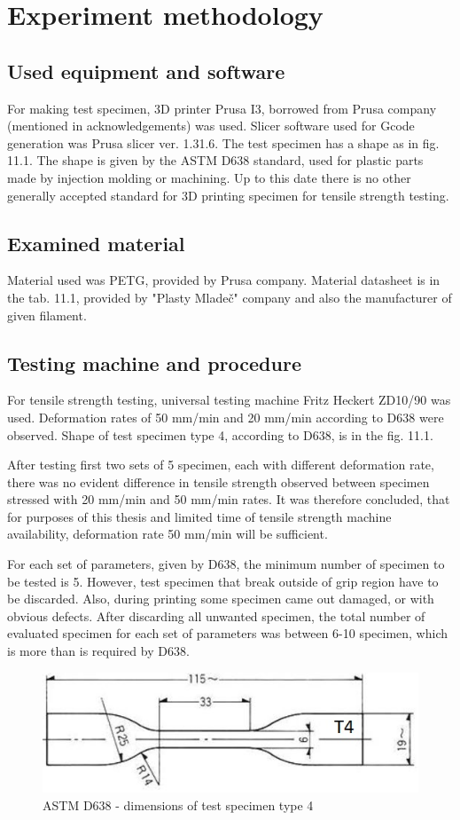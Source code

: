 \documentclass[a4paper, 11pt, reqno]{report}
\begin{document}
\section{Experiment methodology}
%
\subsection{Used equipment and software}
For making test specimen, 3D printer Prusa I3, borrowed from Prusa company (mentioned in acknowledgements) was used. Slicer software used for Gcode generation was Prusa slicer ver. 1.31.6. The test specimen has a shape as in fig. 11.1. The shape is given by the ASTM D638 standard, used for plastic parts made by injection molding or machining. Up to this date there is no other generally accepted standard for 3D printing specimen for tensile strength testing.\\
\subsection{Examined material}
Material used was PETG, provided by Prusa company. Material datasheet is in the tab. 11.1, provided by "Plasty Mladeč" company and also the manufacturer of given filament.

\subsection{Testing machine and procedure}
For tensile strength testing, universal testing machine Fritz Heckert ZD10/90 was used.   Deformation rates of 50 mm/min and 20 mm/min according to D638 were observed. Shape of test specimen type 4, according to D638, is in the fig. 11.1.

	After testing first two sets of 5 specimen, each with different deformation rate, there was no evident difference in tensile strength observed between specimen stressed with 20 mm/min and 50 mm/min rates. It was therefore concluded, that for purposes of this thesis and limited time of tensile strength machine availability, deformation rate 50 mm/min will be sufficient.
	
	For each set of parameters, given by D638, the minimum number of specimen to be tested is 5. However, test specimen that break outside of grip region have to be discarded. Also, during printing some specimen came out damaged, or with obvious defects. After discarding all unwanted specimen, the total number of evaluated specimen for each set of parameters was between 6-10 specimen, which is more than is required by D638.
\\[20pt]
\begin{figure}[h]
\centering
\includegraphics[scale=1]{testSpecimenDimensions2}
\caption{ASTM D638 - dimensions of test specimen type 4}
\end{figure}
\end{document}
